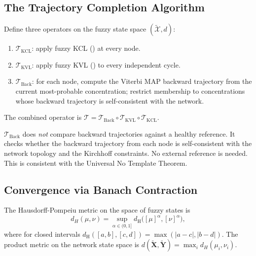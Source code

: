 \subsection{The Trajectory Completion Algorithm}

\begin{definition}
\label{def:constraint-ops}
Define three operators on the fuzzy state space $(\widetilde{\mathcal{X}}, d)$:
\begin{enumerate}[label=(\roman*), noitemsep]
  \item $\mathcal{T}_{\mathrm{KCL}}$: apply fuzzy KCL ()
        at every node.
  \item $\mathcal{T}_{\mathrm{KVL}}$: apply fuzzy KVL ()
        to every independent cycle.
  \item $\mathcal{T}_{\mathrm{Back}}$: for each node, compute the Viterbi MAP
        backward trajectory from the current most-probable concentration;
        restrict membership to concentrations whose backward trajectory is
        self-consistent with the network.
\end{enumerate}
The combined operator is
$\mathcal{T} = \mathcal{T}_{\mathrm{Back}} \circ \mathcal{T}_{\mathrm{KVL}} \circ \mathcal{T}_{\mathrm{KCL}}$.
\end{definition}

\begin{remark}
$\mathcal{T}_{\mathrm{Back}}$ does \emph{not} compare backward trajectories
against a healthy reference.  It checks whether the backward trajectory from
each node is self-consistent with the network topology and the Kirchhoff
constraints.  No external reference is needed.  This is consistent with the
Universal No Template Theorem.
\end{remark}

\subsection{Convergence via Banach Contraction}

\begin{definition}
\label{def:hausdorff}
The Hausdorff-Pompeiu metric on the space of fuzzy states is
\begin{equation}
  d_H(\mu, \nu)
  = \sup_{\alpha \in (0,1]}
    d_{\mathrm{H}}\bigl([\mu]^{\alpha}, [\nu]^{\alpha}\bigr),
  \label{eq:hausdorff}
\end{equation}
where for closed intervals
$d_{\mathrm{H}}([a,b], [c,d]) = \max(|a-c|, |b-d|)$.
The product metric on the network state space is
$d(\widetilde{\mathbf{X}}, \widetilde{\mathbf{Y}}) = \max_i d_H(\mu_i, \nu_i)$.
\end{definition}

